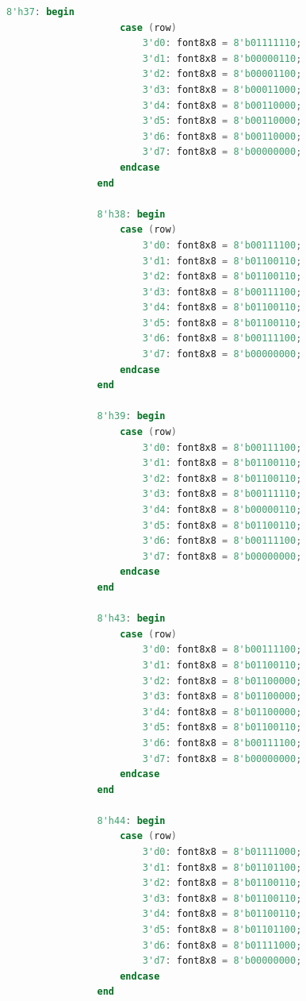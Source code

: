 \begin{lstlisting}[language=Verilog, title={Kode untuk menampilkan data hasil vga ke monitor}, label={code:vga-rgb-565}]
                8'h37: begin
                    case (row)
                        3'd0: font8x8 = 8'b01111110;
                        3'd1: font8x8 = 8'b00000110;
                        3'd2: font8x8 = 8'b00001100;
                        3'd3: font8x8 = 8'b00011000;
                        3'd4: font8x8 = 8'b00110000;
                        3'd5: font8x8 = 8'b00110000;
                        3'd6: font8x8 = 8'b00110000;
                        3'd7: font8x8 = 8'b00000000;
                    endcase
                end

                8'h38: begin
                    case (row)
                        3'd0: font8x8 = 8'b00111100;
                        3'd1: font8x8 = 8'b01100110;
                        3'd2: font8x8 = 8'b01100110;
                        3'd3: font8x8 = 8'b00111100;
                        3'd4: font8x8 = 8'b01100110;
                        3'd5: font8x8 = 8'b01100110;
                        3'd6: font8x8 = 8'b00111100;
                        3'd7: font8x8 = 8'b00000000;
                    endcase
                end

                8'h39: begin
                    case (row)
                        3'd0: font8x8 = 8'b00111100;
                        3'd1: font8x8 = 8'b01100110;
                        3'd2: font8x8 = 8'b01100110;
                        3'd3: font8x8 = 8'b00111110;
                        3'd4: font8x8 = 8'b00000110;
                        3'd5: font8x8 = 8'b01100110;
                        3'd6: font8x8 = 8'b00111100;
                        3'd7: font8x8 = 8'b00000000;
                    endcase
                end

                8'h43: begin
                    case (row)
                        3'd0: font8x8 = 8'b00111100;
                        3'd1: font8x8 = 8'b01100110;
                        3'd2: font8x8 = 8'b01100000;
                        3'd3: font8x8 = 8'b01100000;
                        3'd4: font8x8 = 8'b01100000;
                        3'd5: font8x8 = 8'b01100110;
                        3'd6: font8x8 = 8'b00111100;
                        3'd7: font8x8 = 8'b00000000;
                    endcase
                end

                8'h44: begin
                    case (row)
                        3'd0: font8x8 = 8'b01111000;
                        3'd1: font8x8 = 8'b01101100;
                        3'd2: font8x8 = 8'b01100110;
                        3'd3: font8x8 = 8'b01100110;
                        3'd4: font8x8 = 8'b01100110;
                        3'd5: font8x8 = 8'b01101100;
                        3'd6: font8x8 = 8'b01111000;
                        3'd7: font8x8 = 8'b00000000;
                    endcase
                end


\end{lstlisting}
